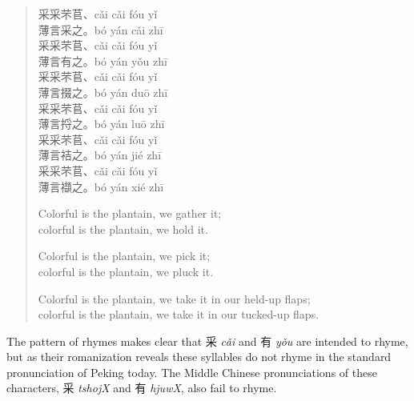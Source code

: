 \begin{quotation}
\noindent
采采芣苢、cǎi cǎi fóu yǐ\\
薄言采之。bó yán cǎi zhī\\
采采芣苢、cǎi cǎi fóu yǐ\\
薄言有之。bó yán yǒu zhī\\
\vspace{2mm}
\noindent
采采芣苢、cǎi cǎi fóu yǐ\\
薄言掇之。bó yán duō zhī\\
采采芣苢、cǎi cǎi fóu yǐ\\
薄言捋之。bó yán luō zhī\\
\vspace{2mm}
\noindent
采采芣苢、cǎi cǎi fóu yǐ\\
薄言袺之。bó yán jié zhī\\
采采芣苢、cǎi cǎi fóu yǐ\\
薄言襭之。bó yán xié zhī\\
\vspace{2mm}

\noindent Colorful is the plantain, we gather it;\\
colorful is the plantain, we hold it.

\vspace{2mm}
\noindent Colorful is the plantain, we pick it;\\
colorful is the plantain, we pluck it.

\vspace{2mm}
\noindent Colorful is the plantain, we take it in our held-up flaps;\\
colorful is the plantain, we take it in our tucked-up flaps.\\
\end{quotation}

The pattern of rhymes makes clear that 采 \emph{cǎi} and 有  \emph{yǒu}
are intended to rhyme, but as their romanization reveals these syllables
do not rhyme in the standard pro­nun­ci­a­tion of Peking today. The
Middle Chinese pronunciations of these characters, 采  \emph{tshojX} and
有  \emph{hjuwX}, also fail to rhyme.

